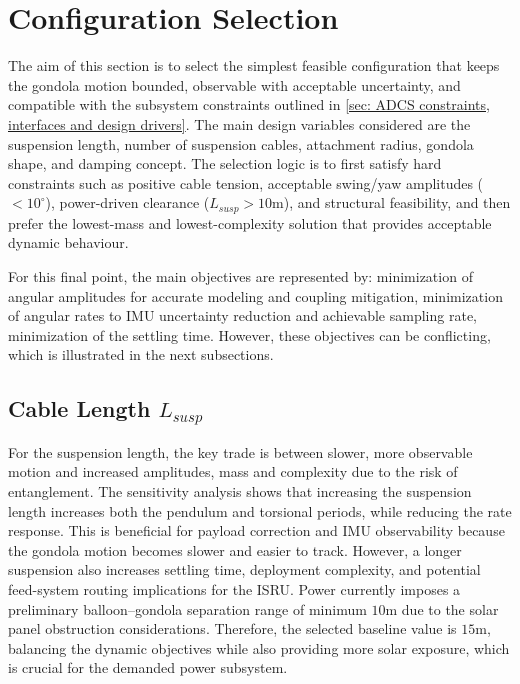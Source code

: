 \section{Configuration Selection}
\label{sec: configuration selection}

The aim of this section is to select the simplest feasible configuration that keeps the gondola motion bounded, observable with acceptable uncertainty, and compatible with the subsystem constraints outlined in \autoref{sec: ADCS constraints, interfaces and design drivers}. The main design variables considered are the suspension length, number of suspension cables, attachment radius, gondola shape, and damping concept. The selection logic is to first satisfy hard constraints such as positive cable tension, acceptable swing/yaw amplitudes ($<10 ^\circ$), power-driven clearance ($L_{susp}>10$m), and structural feasibility, and then prefer the lowest-mass and lowest-complexity solution that provides acceptable dynamic behaviour.

For this final point, the main objectives are represented by: minimization of angular amplitudes for accurate modeling and coupling mitigation, minimization of angular rates to IMU uncertainty reduction and achievable sampling rate, minimization of the settling time. However, these objectives can be conflicting, which is illustrated in the next subsections.  

\subsection{Cable Length $L_{susp}$}
\label{subsec: Cable Length}
For the suspension length, the key trade is between slower, more observable motion and increased amplitudes, mass and complexity due to the risk of entanglement. The sensitivity analysis shows that increasing the suspension length increases both the pendulum and torsional periods, while reducing the rate response. This is beneficial for payload correction and IMU observability because the gondola motion becomes slower and easier to track. However, a longer suspension also increases settling time, deployment complexity, and potential feed-system routing implications for the ISRU. Power currently imposes a preliminary balloon–gondola separation range of minimum $10$m due to the solar panel obstruction considerations. Therefore, the selected baseline value is $15$m, balancing the dynamic objectives while also providing more solar exposure, which is crucial for the demanded power subsystem.

